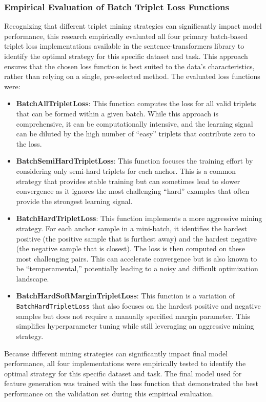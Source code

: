 \subsubsection{Empirical Evaluation of Batch Triplet Loss Functions}
Recognizing that different triplet mining strategies can significantly impact model performance, this research empirically evaluated all four primary batch-based triplet loss implementations available in the sentence-transformers library to identify the optimal strategy for this specific dataset and task. This approach ensures that the chosen loss function is best suited to the data's characteristics, rather than relying on a single, pre-selected method. The evaluated loss functions were:
\begin{itemize}
    \item \textbf{BatchAllTripletLoss}: This function computes the loss for all valid triplets that can be formed within a given batch. While this approach is comprehensive, it can be computationally intensive, and the learning signal can be diluted by the high number of ``easy'' triplets that contribute zero to the loss.
    \item \textbf{BatchSemiHardTripletLoss}: This function focuses the training effort by considering only semi-hard triplets for each anchor. This is a common strategy that provides stable training but can sometimes lead to slower convergence as it ignores the most challenging ``hard'' examples that often provide the strongest learning signal.
    \item \textbf{BatchHardTripletLoss}: This function implements a more aggressive mining strategy. For each anchor sample in a mini-batch, it identifies the hardest positive (the positive sample that is furthest away) and the hardest negative (the negative sample that is closest). The loss is then computed on these most challenging pairs. This can accelerate convergence but is also known to be ``temperamental,'' potentially leading to a noisy and difficult optimization landscape.
    \item \textbf{BatchHardSoftMarginTripletLoss}: This function is a variation of \verb|BatchHardTripletLoss| that also focuses on the hardest positive and negative samples but does not require a manually specified margin parameter. This simplifies hyperparameter tuning while still leveraging an aggressive mining strategy.{\setlength{\emergencystretch}{5em}\par}
\end{itemize}
Because different mining strategies can significantly impact final model performance, all four implementations were empirically tested to identify the optimal strategy for this specific dataset and task. The final model used for feature generation was trained with the loss function that demonstrated the best performance on the validation set during this empirical evaluation.

